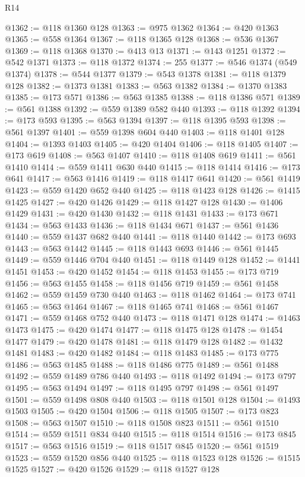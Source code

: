 \begin{lexlean}{R14}
\begin{coremodule}
{{{{{{{{{{{{{{{{{{{{{{{{{{{{{{{{{{{{{{{{{{{{{{{{{{{{{{{{{{{{{{{{{{{{{{{{{{{{{{{{{{@1362 := @118 @1360 @128
@1363 := @975 @1362
@1364 := @420 @1363
@1365 := @558 @1364
@1367 := @118 @1365 @128
@1368 := @536 @1367
@1369 := @118 @1368
@1370 := @413 @13
@1371 := @143 @1251
@1372 := @542 @1371
@1373 := @118 @1372
@1374 := 255
@1377 := @546 @1374 (@549 @1374)
@1378 := @544 @1377
@1379 := @543 @1378
@1381 := @118 @1379 @128
@1382 := @1373 @1381
@1383 := @563 @1382
@1384 := @1370 @1383
@1385 := @173 @571
@1386 := @563 @1385
@1388 := @118 @1386 @571
@1389 := @561 @1388
@1392 := @559 @1389 @582 @440
@1393 := @118 @1392
@1394 := @173 @593
@1395 := @563 @1394
@1397 := @118 @1395 @593
@1398 := @561 @1397
@1401 := @559 @1398 @604 @440
@1403 := @118 @1401 @128
@1404 := @1393 @1403
@1405 := @420 @1404
@1406 := @118 @1405
@1407 := @173 @619
@1408 := @563 @1407
@1410 := @118 @1408 @619
@1411 := @561 @1410
@1414 := @559 @1411 @630 @440
@1415 := @118 @1414
@1416 := @173 @641
@1417 := @563 @1416
@1419 := @118 @1417 @641
@1420 := @561 @1419
@1423 := @559 @1420 @652 @440
@1425 := @118 @1423 @128
@1426 := @1415 @1425
@1427 := @420 @1426
@1429 := @118 @1427 @128
@1430 := @1406 @1429
@1431 := @420 @1430
@1432 := @118 @1431
@1433 := @173 @671
@1434 := @563 @1433
@1436 := @118 @1434 @671
@1437 := @561 @1436
@1440 := @559 @1437 @682 @440
@1441 := @118 @1440
@1442 := @173 @693
@1443 := @563 @1442
@1445 := @118 @1443 @693
@1446 := @561 @1445
@1449 := @559 @1446 @704 @440
@1451 := @118 @1449 @128
@1452 := @1441 @1451
@1453 := @420 @1452
@1454 := @118 @1453
@1455 := @173 @719
@1456 := @563 @1455
@1458 := @118 @1456 @719
@1459 := @561 @1458
@1462 := @559 @1459 @730 @440
@1463 := @118 @1462
@1464 := @173 @741
@1465 := @563 @1464
@1467 := @118 @1465 @741
@1468 := @561 @1467
@1471 := @559 @1468 @752 @440
@1473 := @118 @1471 @128
@1474 := @1463 @1473
@1475 := @420 @1474
@1477 := @118 @1475 @128
@1478 := @1454 @1477
@1479 := @420 @1478
@1481 := @118 @1479 @128
@1482 := @1432 @1481
@1483 := @420 @1482
@1484 := @118 @1483
@1485 := @173 @775
@1486 := @563 @1485
@1488 := @118 @1486 @775
@1489 := @561 @1488
@1492 := @559 @1489 @786 @440
@1493 := @118 @1492
@1494 := @173 @797
@1495 := @563 @1494
@1497 := @118 @1495 @797
@1498 := @561 @1497
@1501 := @559 @1498 @808 @440
@1503 := @118 @1501 @128
@1504 := @1493 @1503
@1505 := @420 @1504
@1506 := @118 @1505
@1507 := @173 @823
@1508 := @563 @1507
@1510 := @118 @1508 @823
@1511 := @561 @1510
@1514 := @559 @1511 @834 @440
@1515 := @118 @1514
@1516 := @173 @845
@1517 := @563 @1516
@1519 := @118 @1517 @845
@1520 := @561 @1519
@1523 := @559 @1520 @856 @440
@1525 := @118 @1523 @128
@1526 := @1515 @1525
@1527 := @420 @1526
@1529 := @118 @1527 @128
}}}}}}}}}}}}}}}}}}}}}}}}}}}}}}}}}}}}}}}}}}}}}}}}}}}}}}}}}}}}}}}}}}}}}}}}}}}}}}}}}}
\end{coremodule}
\end{lexlean}
